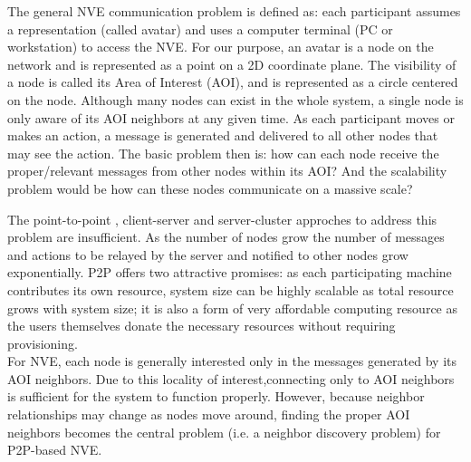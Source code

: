 \documentclass[12pt]{article}
\begin{document}
\cite{Hu:2004:SPN:1016540.1016552} The general NVE communication problem is defined as: each participant assumes a representation (called avatar) and uses a computer terminal (PC or workstation) to access the NVE. For our purpose, an avatar is a node on the network and is represented as a point on a 2D coordinate plane. The visibility of a node is called its Area of Interest (AOI), and is represented as a circle centered on the node. Although many nodes can exist in the whole system, a single node is only aware of its AOI neighbors at any given time. As each participant moves or makes an action, a message is generated and delivered to all other nodes that may see the action. The basic problem then is: how can each node receive the proper/relevant messages from other nodes within its AOI? And the scalability problem would be how can these nodes communicate on a massive scale?

The point-to-point , client-server and server-cluster approches to address this problem are insufficient. As the number of nodes grow the number of messages and actions to be relayed by the server and notified to other nodes grow exponentially. P2P offers two attractive promises: as each participating machine contributes its own resource, system size can be highly scalable as total resource grows with system size; it is also a form of very affordable computing resource as the users themselves donate the necessary resources without requiring provisioning.\\

For NVE, each node is generally interested only in the messages generated by its AOI neighbors. Due to this locality of interest,connecting only to AOI neighbors is sufficient for the system to function properly. However, because neighbor relationships may change as nodes move around, finding the proper AOI neighbors becomes the central problem (i.e. a neighbor discovery problem) for P2P-based NVE.\\
\end{document}
